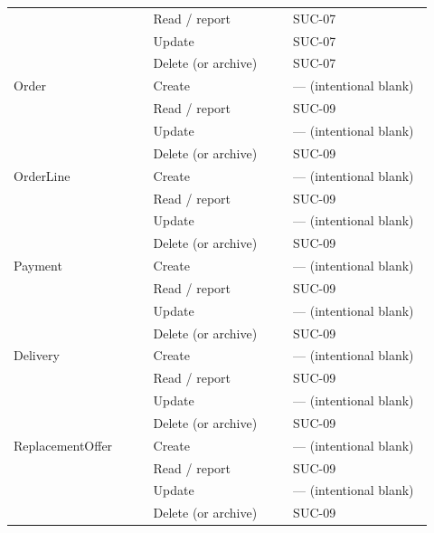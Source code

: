 \begin{longtable}{>{\raggedright\arraybackslash}p{0.3067\linewidth}>{\raggedright\arraybackslash}p{0.3067\linewidth}>{\raggedright\arraybackslash}p{0.3067\linewidth}}
 & Read / report & SUC-07 \\
 & Update & SUC-07 \\
 & Delete (or archive) & SUC-07 \\
Order & Create & --- (intentional blank) \\
 & Read / report & SUC-09 \\
 & Update & --- (intentional blank) \\
 & Delete (or archive) & SUC-09 \\
OrderLine & Create & --- (intentional blank) \\
 & Read / report & SUC-09 \\
 & Update & --- (intentional blank) \\
 & Delete (or archive) & SUC-09 \\
Payment & Create & --- (intentional blank) \\
 & Read / report & SUC-09 \\
 & Update & --- (intentional blank) \\
 & Delete (or archive) & SUC-09 \\
Delivery & Create & --- (intentional blank) \\
 & Read / report & SUC-09 \\
 & Update & --- (intentional blank) \\
 & Delete (or archive) & SUC-09 \\
ReplacementOffer & Create & --- (intentional blank) \\
 & Read / report & SUC-09 \\
 & Update & --- (intentional blank) \\
 & Delete (or archive) & SUC-09 \\
\end{longtable}
